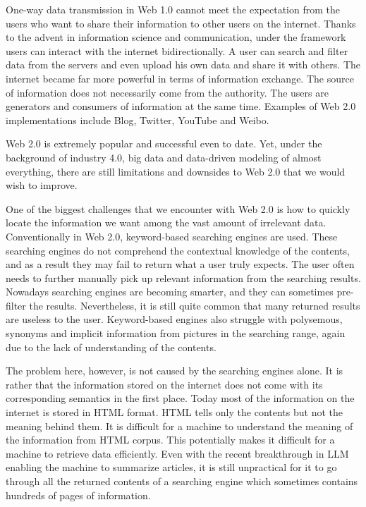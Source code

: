 One-way data transmission in Web 1.0 cannot meet the expectation from the users who want to share their information to other users on the internet. Thanks to the advent in information science and communication, under the  framework users can interact with the internet bidirectionally. A user can search and filter data from the servers and even upload his own data and share it with others. The internet became far more powerful in terms of information exchange. The source of information does not necessarily come from the authority. The users are generators and consumers of information at the same time. Examples of Web 2.0 implementations include Blog, Twitter, YouTube and Weibo.

Web 2.0 is extremely popular and successful even to date. Yet, under the background of industry 4.0, big data and data-driven modeling of almost everything, there are still limitations and downsides to Web 2.0 that we would wish to improve.

One of the biggest challenges that we encounter with Web 2.0 is how to quickly locate the information we want among the vast amount of irrelevant data. Conventionally in Web 2.0, keyword-based searching engines are used. These searching engines do not comprehend the contextual knowledge of the contents, and as a result they may fail to return what a user truly expects. The user often needs to further manually pick up relevant information from the searching results. Nowadays searching engines are becoming smarter, and they can sometimes pre-filter the results. Nevertheless, it is still quite common that many returned results are useless to the user. Keyword-based engines also struggle with polysemous, synonyms and implicit information from pictures in the searching range, again due to the lack of understanding of the contents.

The problem here, however, is not caused by the searching engines alone.  It is rather that the information stored on the internet does not come with its corresponding semantics in the first place. Today most of the information on the internet is stored in HTML format. HTML tells only the contents but not the meaning behind them. It is difficult for a machine to understand the meaning of the information from HTML corpus. This potentially makes it difficult for a machine to retrieve data efficiently. Even with the recent breakthrough in LLM enabling the machine to summarize articles, it is still unpractical for it to go through all the returned contents of a searching engine which sometimes contains hundreds of pages of information.

